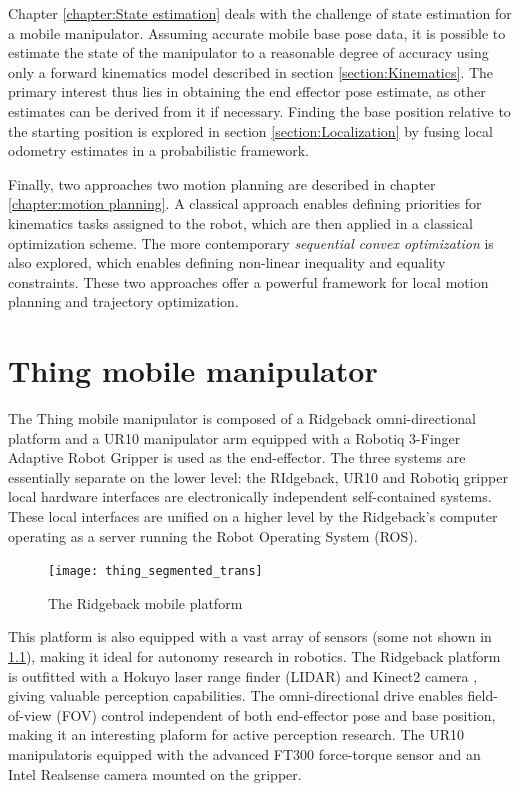 \documentclass[times, utf8, diplomski, english]{fer}
\begin{document}
Chapter \ref{chapter:State estimation} deals with the challenge of state estimation for a mobile manipulator.
Assuming accurate mobile base pose data, it is possible to estimate the state of the manipulator to a reasonable degree of accuracy using only a forward kinematics model described in section \ref{section:Kinematics}.
The primary interest thus lies in obtaining the end effector pose estimate, as other estimates can be derived from it if necessary.
Finding the base position relative to the starting position is explored in section \ref{section:Localization} by fusing local odometry estimates in a probabilistic framework.

Finally, two approaches two motion planning are described in chapter \ref{chapter:motion planning}.
A classical approach enables defining priorities for kinematics tasks assigned to the robot, which are then applied in a classical optimization scheme.
The more contemporary \textit{sequential convex optimization} is also explored, which enables defining non-linear inequality and equality constraints. 
These two approaches offer a powerful framework for local motion planning and trajectory optimization.

\chapter{Thing mobile manipulator}\label{chapter:thing}
The Thing mobile manipulator is composed of a Ridgeback omni-directional platform and a UR10 manipulator arm equipped with a Robotiq 3-Finger Adaptive Robot Gripper is used as the end-effector.
The three systems are essentially separate on the lower level: the RIdgeback, UR10 and Robotiq gripper local hardware interfaces are electronically independent self-contained systems.
These local interfaces are unified on a higher level by the Ridgeback's computer operating as a server running the Robot Operating System (ROS).
\begin{figure}[h]
\label{figure:thing}
\centering
\texttt{[image: thing\_segmented\_trans]}
\caption{The Ridgeback mobile platform}
\end{figure}
This platform is also equipped with a vast array of sensors (some not shown in \ref{figure:thing}), making it ideal for autonomy research in robotics. 
The Ridgeback platform is outfitted with a Hokuyo laser range finder (LIDAR) and Kinect2 camera , giving valuable perception capabilities.
The omni-directional drive enables field-of-view (FOV) control independent of both end-effector pose and base position, making it an interesting plaform for active perception research.
The UR10 manipulatoris equipped with the advanced FT300 force-torque sensor and an Intel Realsense camera mounted on the gripper.
\end{document}
